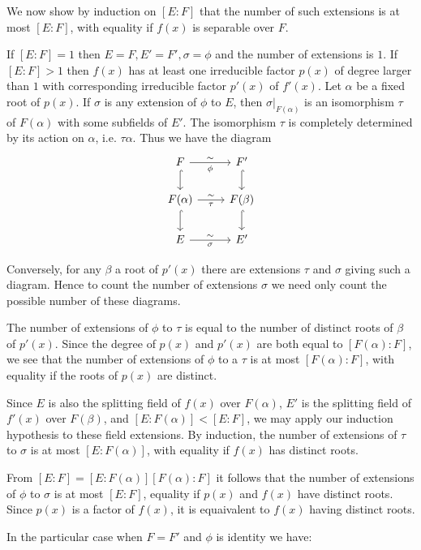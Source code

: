 \documentclass[a4paper]{article}
\begin{document}
We now show by induction on $[E : F]$ that the number of such extensions is at most $[E : F]$, with equality if $f(x)$ is separable over $F$.

If $[E : F] = 1$ then $E = F, E' = F', \sigma = \phi$ and the number of extensions is $1$. If $[E : F] > 1$ then $f(x)$ has at least one irreducible factor $p(x)$ of degree larger than $1$ with corresponding irreducible factor $p'(x)$ of $f'(x)$. Let $\alpha$ be a fixed root of $p(x)$. If $\sigma$ is any extension of $\phi$ to $E$, then $\sigma|_{F(\alpha)}$ is an isomorphism $\tau$ of $F(\alpha)$ with some subfields of $E'$. The isomorphism $\tau$ is completely determined by its action on $\alpha$, i.e. $\tau\alpha$. Thus we have the diagram
\[
  \begin{tikzcd}
    F \arrow{r}{\sim}[swap]{\phi} \arrow[hook]{d} & F' \arrow[hook]{d}\\
    F(\alpha) \arrow{r}{\sim}[swap]{\tau} \arrow[hook]{d} & F(\beta) \arrow[hook]{d}\\
    E \arrow{r}{\sim}[swap]{\sigma} & E'
  \end{tikzcd}
\]

Conversely, for any $\beta$ a root of $p'(x)$ there are extensions $\tau$ and $\sigma$ giving such a diagram. Hence to count the number of extensions $\sigma$ we need only count the possible number of these diagrams.

The number of extensions of $\phi$ to $\tau$ is equal to the number of distinct roots of $\beta$ of $p'(x)$. Since the degree of $p(x)$ and $p'(x)$ are both equal to $[F(\alpha) : F]$, we see that the number of extensions of $\phi$ to a $\tau$ is at most $[F(\alpha) : F]$, with equality if the roots of $p(x)$ are distinct.

Since $E$ is also the splitting field of $f(x)$ over $F(\alpha)$, $E'$ is the splitting field of $f'(x)$ over $F(\beta)$, and $[E : F(\alpha)] < [E : F]$, we may apply our induction hypothesis to these field extensions. By induction, the number of extensions of $\tau$ to $\sigma$ is at most $[E : F(\alpha)]$, with equality if $f(x)$ has distinct roots.

From $[E : F] = [E: F(\alpha)] [F(\alpha) : F]$ it follows that the number of extensions of $\phi$ to $\sigma$ is at most $[E : F]$, equality if $p(x)$ and $f(x)$ have distinct roots. Since $p(x)$ is a factor of $f(x)$, it is equaivalent to $f(x)$ having distinct roots.

In the particular case when $F = F'$ and $\phi$ is identity we have:
\end{document}
